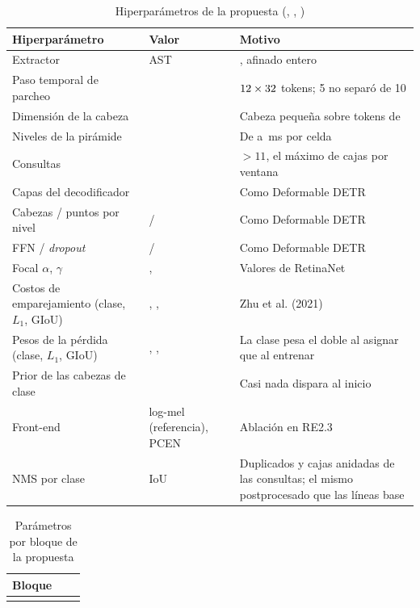 \documentclass[12pt,a4paper]{article}
\begin{document}
\begin{table}[htbp]
    \centering
    \caption{Hiperparámetros de la propuesta (,
        , )}
    \label{tab:hiperparametros}
    \small
    \begin{tabular}{@{}L{4.6cm}L{2.8cm}L{6.6cm}@{}}
        \toprule
        \textbf{Hiperparámetro} & \textbf{Valor} & \textbf{Motivo} \\
        \midrule
        Extractor & AST & \code{\astCheckpoint}, afinado entero \\
        Paso temporal de parcheo & \timeStride{} & $12 \times 32$ tokens; 5 no separó de 10 \\
        Dimensión de la cabeza & \headDim{} & Cabeza pequeña sobre tokens de \hidden{} \\
        Niveles de la pirámide & \nLevels{} & De \cellZero{} a \cellThree{}\,ms por celda \\
        Consultas & \nQueries{} & $> 11$, el máximo de cajas por ventana \\
        Capas del decodificador & \nDecoderLayers{} & Como Deformable DETR \\
        Cabezas / puntos por nivel & \nHeads{} / \nPoints{} & Como Deformable DETR \\
        FFN / \textit{dropout} & \ffn{} / \dropout{} & Como Deformable DETR \\
        Focal $\alpha$, $\gamma$ & \focalAlpha{}, \focalGamma{} & Valores de RetinaNet \\
        Costos de emparejamiento (clase, $L_1$, GIoU) & \costClass{}, \costBbox{}, \costIou{} & Zhu et al. (2021) \\
        Pesos de la pérdida (clase, $L_1$, GIoU) & \weightClass{}, \costBbox{}, \costIou{} & La clase pesa el doble al asignar que al entrenar \\
        Prior de las cabezas de clase & \priorProb{} & Casi nada dispara al inicio \\
        Front-end & log-mel (referencia), PCEN & Ablación en RE2.3 \\
        NMS por clase & IoU \nmsIou{} & Duplicados y cajas anidadas de las \nQueries{} consultas; el mismo postprocesado que las líneas base \\
        \bottomrule
    \end{tabular}
\end{table}

\begin{table}[htbp]
    \centering
    \caption{Parámetros por bloque de la propuesta}
    \label{tab:bloques}
    \small
    \begin{tabular}{@{}L{6.4cm}rr@{}}
        \toprule
        \textbf{Bloque} &  &  \\
        \midrule
         \\
        \bottomrule
    \end{tabular}
\end{table}
\end{document}
